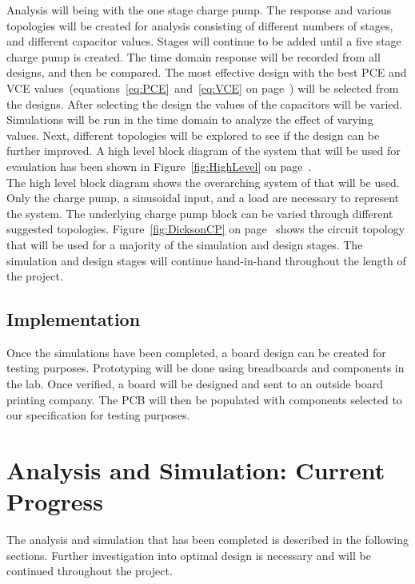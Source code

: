\documentclass[12pt]{article}
\begin{document}
	\noindent Analysis will being with the one stage charge pump. The response and various topologies will be created for analysis consisting of different numbers of stages, and different capacitor values. Stages will continue to be added until a five stage charge pump is created. The time domain response will be recorded from all designs, and then be compared. The most effective design with the best PCE and VCE values~(equations~\ref{eq:PCE}~and~\ref{eq:VCE} on page~\pageref{eq:PCE}) will be selected from the designs. After selecting the design the values of the capacitors will be varied. Simulations will be run in the time domain to analyze the effect of varying values. Next, different topologies will be explored to see if the design can be further improved. A high level block diagram of the system that will be used for evaulation has been shown in Figure~\ref{fig:HighLevel} on page~\pageref{fig:HighLevel}.\\

\noindent The high level block diagram shows the overarching system of that will be used. Only the charge pump, a sinusoidal input, and a load are necessary to represent the system. The underlying charge pump block can be varied through different suggested topologies. Figure~\ref{fig:DicksonCP}  on page~\pageref{fig:DicksonCP} shows the circuit topology that will be used for a majority of the simulation and design stages. The simulation and design stages will continue hand-in-hand throughout the length of the project.

	\subsection{Implementation}
	Once the simulations have been completed, a board design can be created for testing purposes. Prototyping will be done using breadboards and components in the lab. Once verified, a board will be designed and sent to an outside board printing company. The PCB will then be populated with components selected to our specification for testing purposes.
	
	\section{Analysis and Simulation: Current Progress}
	
	The analysis and simulation that has been completed is described in the following sections. Further investigation into optimal design is necessary and will be continued throughout the project.
	
\end{document}
